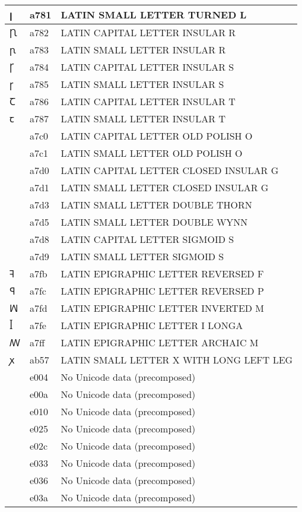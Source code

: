 \documentclass[12pt,letterpaper,openany]{book}
\begin{document}
\begin{center}
\begin{supertabular}{|m{0.25in}|m{0.5in}|m{4in}|}
ꞁ & a781 & LATIN SMALL LETTER TURNED L\\\hline
Ꞃ & a782 & LATIN CAPITAL LETTER INSULAR R\\\hline
ꞃ & a783 & LATIN SMALL LETTER INSULAR R\\\hline
Ꞅ & a784 & LATIN CAPITAL LETTER INSULAR S\\\hline
ꞅ & a785 & LATIN SMALL LETTER INSULAR S\\\hline
Ꞇ & a786 & LATIN CAPITAL LETTER INSULAR T\\\hline
ꞇ & a787 & LATIN SMALL LETTER INSULAR T\\\hline
Ꟁ & a7c0 & LATIN CAPITAL LETTER OLD POLISH O\\\hline
ꟁ & a7c1 & LATIN SMALL LETTER OLD POLISH O\\\hline
Ꟑ & a7d0 & LATIN CAPITAL LETTER CLOSED INSULAR G\\\hline
ꟑ & a7d1 & LATIN SMALL LETTER CLOSED INSULAR G\\\hline
ꟓ & a7d3 & LATIN SMALL LETTER DOUBLE THORN\\\hline
ꟕ & a7d5 & LATIN SMALL LETTER DOUBLE WYNN\\\hline
Ꟙ & a7d8 & LATIN CAPITAL LETTER SIGMOID S\\\hline
ꟙ & a7d9 & LATIN SMALL LETTER SIGMOID S\\\hline
ꟻ & a7fb & LATIN EPIGRAPHIC LETTER REVERSED F\\\hline
ꟼ & a7fc & LATIN EPIGRAPHIC LETTER REVERSED P\\\hline
ꟽ & a7fd & LATIN EPIGRAPHIC LETTER INVERTED M\\\hline
ꟾ & a7fe & LATIN EPIGRAPHIC LETTER I LONGA\\\hline
ꟿ & a7ff & LATIN EPIGRAPHIC LETTER ARCHAIC M\\\hline
ꭗ & ab57 & LATIN SMALL LETTER X WITH LONG LEFT LEG\\\hline
 & e004 & No Unicode data (precomposed)\\\hline
 & e00a & No Unicode data (precomposed)\\\hline
 & e010 & No Unicode data (precomposed)\\\hline
 & e025 & No Unicode data (precomposed)\\\hline
 & e02c & No Unicode data (precomposed)\\\hline
 & e033 & No Unicode data (precomposed)\\\hline
 & e036 & No Unicode data (precomposed)\\\hline
 & e03a & No Unicode data (precomposed)\\\hline

\end{supertabular}
\end{center}
\end{document}
